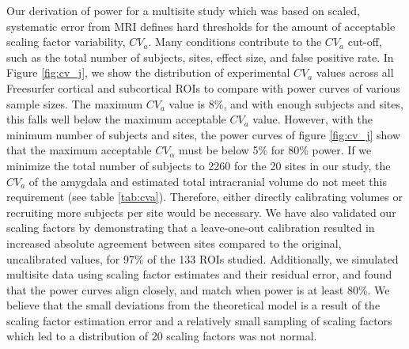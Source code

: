 Our derivation of power for a multisite study which was based on scaled, systematic error from MRI defines hard thresholds for the amount of acceptable scaling factor variability, $CV_{a}$. Many conditions contribute to the $CV_{a}$ cut-off, such as the total number of subjects, sites, effect size, and false positive rate. In Figure \ref{fig:cv_j}, we show the distribution of experimental $CV_{a}$ values across all Freesurfer cortical and subcortical ROIs to compare with power curves of various sample sizes. The maximum $CV_{a}$ value is 8\%, and with enough subjects and sites, this falls well below the maximum acceptable $CV_{a}$ value. However, with the minimum number of subjects and sites, the power curves of figure \ref{fig:cv_j} show that the maximum acceptable $CV_{\alpha}$ must be below 5\% for 80\% power. If we minimize the total number of subjects to 2260 for the 20 sites in our study, the $CV_{a}$ of the amygdala and estimated total intracranial volume do not meet this requirement (see table \ref{tab:cva}). Therefore, either directly calibrating volumes or recruiting more subjects per site  would be necessary. We have also validated our scaling factors by demonstrating that a leave-one-out calibration resulted in increased absolute agreement between sites compared to the original, uncalibrated values, for 97\% of the 133 ROIs studied. Additionally, we simulated multisite data using scaling factor estimates and their residual error, and found that the power curves align closely, and match when power is at least 80\%. We believe that the small deviations from the theoretical model is a result of the scaling factor estimation error and a relatively small sampling of scaling factors which led to a distribution of 20 scaling factors was not normal.  